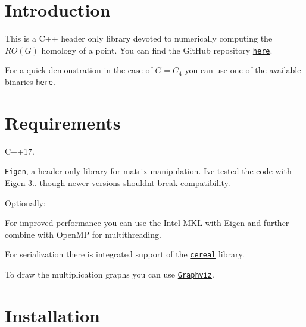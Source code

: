 \hypertarget{index_intro}{}\section{Introduction}\label{index_intro}
This is a C++ header only library devoted to numerically computing the $RO(G)$ homology of a point. You can find the Git\+Hub repository \href{https://github.com/NickG-Math/Mackey}{\tt here}.

For a quick demonstration in the case of $G=C_4$ you can use one of the available binaries \href{https://github.com/NickG-Math/Mackey/tree/master/bin}{\tt here}.\hypertarget{index_req}{}\section{Requirements}\label{index_req}

\begin{DoxyItemize}
\item C++17.
\item \href{ http://eigen.tuxfamily.org/index.php?title=Main_Page}{\tt Eigen}, a header only library for matrix manipulation. I\textquotesingle{}ve tested the code with \hyperlink{namespaceEigen}{Eigen} 3.. though newer versions shouldn\textquotesingle{}t break compatibility.
\end{DoxyItemize}

Optionally\+:
\begin{DoxyItemize}
\item For improved performance you can use the Intel M\+KL with \hyperlink{namespaceEigen}{Eigen} and further combine with Open\+MP for multithreading.
\item For serialization there is integrated support of the \href{https://uscilab.github.io/cereal}{\tt cereal} library.
\item To draw the multiplication graphs you can use \href{https://www.graphviz.org}{\tt Graphviz}.
\end{DoxyItemize}\hypertarget{index_install}{}\section{Installation}\label{index_install}

